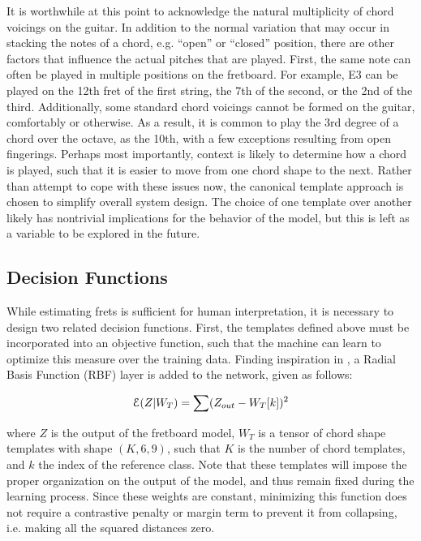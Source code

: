 It is worthwhile at this point to acknowledge the natural multiplicity of chord voicings on the guitar.
In addition to the normal variation that may occur in stacking the notes of a chord, e.g. ``open'' or ``closed'' position, there are other factors that influence the actual pitches that are played.
First, the same note can often be played in multiple positions on the fretboard.
For example, E3 can be played on the 12th fret of the first string, the 7th of the second, or the 2nd of the third.
Additionally, some standard chord voicings cannot be formed on the guitar, comfortably or otherwise.
As a result, it is common to play the 3rd degree of a chord over the octave, as the 10th, with a few exceptions resulting from open fingerings.
Perhaps most importantly, context is likely to determine how a chord is played, such that it is easier to move from one chord shape to the next.
Rather than attempt to cope with these issues now, the canonical template approach is chosen to simplify overall system design.
The choice of one template over another likely has nontrivial implications for the behavior of the model, but this is left as a variable to be explored in the future.


\subsection{Decision Functions}
\label{subsec:loss}

While estimating frets is sufficient for human interpretation, it is necessary to design two related decision functions.
First, the templates defined above must be incorporated into an objective function, such that the machine can learn to optimize this measure over the training data.
Finding inspiration in \cite{LeCun1998}, a Radial Basis Function (RBF) layer is added to the network, given as follows:

\begin{equation}
\small
\mathcal{E}(Z \vert W_T) = \sum(Z_{out} - W_{T}[k])^2
\end{equation}

\noindent where $Z$ is the output of the fretboard model, $W_T$ is a tensor of chord shape templates with shape $(K, 6, 9)$, such that $K$ is the number of chord templates, and $k$ the index of the reference class.
Note that these templates will impose the proper organization on the output of the model, and thus remain fixed during the learning process.
Since these weights are constant, minimizing this function does not require a contrastive penalty or margin term to prevent it from collapsing, i.e. making all the squared distances zero.

